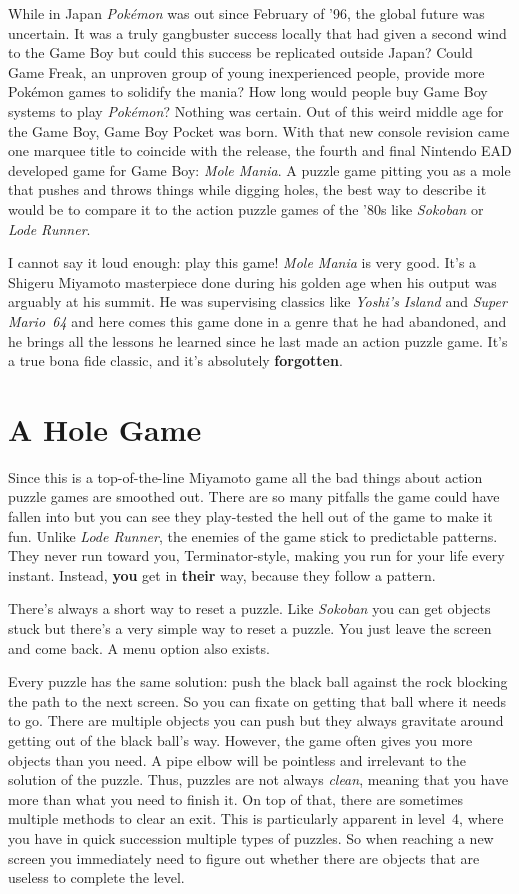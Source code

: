 \documentclass{book}
\begin{document}
While in Japan \emph{Pokémon} was out since February of ’96, the global future was uncertain. It was a truly gangbuster success locally that had given a second wind to the Game Boy but could this success be replicated outside Japan? Could Game Freak, an unproven group of young inexperienced people, provide more Pokémon games to solidify the mania? How long would people buy Game Boy systems to play \emph{Pokémon}? Nothing was certain. Out of this weird middle age for the Game Boy, Game Boy Pocket was born. With that new console revision came one marquee title to coincide with the release, the fourth and final Nintendo EAD developed game for Game Boy: \emph{Mole Mania}. A puzzle game pitting you as a mole that pushes and throws things while digging holes, the best way to describe it would be to compare it to the action puzzle games of the ’80s like \emph{Sokoban} or \emph{Lode Runner}.

I cannot say it loud enough: play this game! \emph{Mole Mania} is very good. It’s a Shigeru Miyamoto masterpiece done during his golden age when his output was arguably at his summit. He was supervising classics like \emph{Yoshi’s Island} and \emph{Super Mario 64} and here comes this game done in a genre that he had abandoned, and he brings all the lessons he learned since he last made an action puzzle game. It’s a true bona fide classic, and it’s absolutely \textbf{forgotten}.

\FloatBarrier\needspace{10mm}\section*{A Hole Game}\nopagebreak[4]
Since this is a top-of-the-line Miyamoto game all the bad things about action puzzle games are smoothed out. There are so many pitfalls the game could have fallen into but you can see they play-tested the hell out of the game to make it fun. Unlike \emph{Lode Runner}, the enemies of the game stick to predictable patterns. They never run toward you, Terminator-style, making you run for your life every instant. Instead, \textbf{you} get in \textbf{their} way, because they follow a pattern.

There’s always a short way to reset a puzzle. Like \emph{Sokoban} you can get objects stuck but there’s a very simple way to reset a puzzle. You just leave the screen and come back. A menu option also exists.

Every puzzle has the same solution: push the black ball against the rock blocking the path to the next screen. So you can fixate on getting that ball where it needs to go. There are multiple objects you can push but they always gravitate around getting out of the black ball’s way. However, the game often gives you more objects than you need. A pipe elbow will be pointless and irrelevant to the solution of the puzzle. Thus, puzzles are not always \emph{clean}, meaning that you have more than what you need to finish it. On top of that, there are sometimes multiple methods to clear an exit. This is particularly apparent in level 4, where you have in quick succession multiple types of puzzles. So when reaching a new screen you immediately need to figure out whether there are objects that are useless to complete the level.
\end{document}
